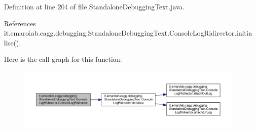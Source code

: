 Definition at line 204 of file Standalone\-Debugging\-Text.\-java.



References it.\-emarolab.\-cagg.\-debugging.\-Standalone\-Debugging\-Text.\-Console\-Log\-Ridirector.\-initialise().



Here is the call graph for this function\-:\nopagebreak
\begin{figure}[H]
\begin{center}
\leavevmode
\includegraphics[width=350pt]{classit_1_1emarolab_1_1cagg_1_1debugging_1_1StandaloneDebuggingText_1_1ConsoleLogRidirector_a4241ba7bd634ec0f72d005fc0c56c69e_cgraph}
\end{center}
\end{figure}


